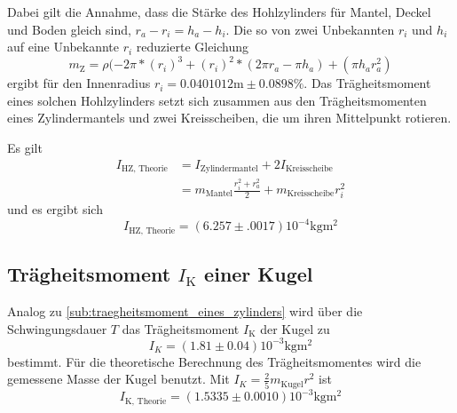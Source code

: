 Dabei gilt die Annahme, dass die Stärke des Hohlzylinders für Mantel, Deckel und Boden gleich sind, $r_a-r_i=h_a-h_i$. 
Die so von zwei Unbekannten $r_i$ und $h_i$ auf eine Unbekannte $r_i$ reduzierte Gleichung
\begin{equation}
	m_\text{Z}=\rho(-2\pi*(r_i)^3+(r_i)^2*(2\pi r_a-\pi h_a)+(\pi h_a r_a^2)
\end{equation}
ergibt für den Innenradius $r_i = 0.0401012\si{\meter}\pm0.0898\%$.
Das Trägheitsmoment eines solchen Hohlzylinders setzt sich zusammen aus den Trägheitsmomenten eines Zylindermantels und zwei Kreisscheiben, die um ihren Mittelpunkt rotieren\cite{kuchen}.

Es gilt
\begin{align*}
	I_{\text{HZ, Theorie}}&=I_{\text{Zylindermantel}}+2I_{\text{Kreisscheibe}}\\
	&=m_\text{Mantel} \frac{r_i^2+r_a^2}{2}+m_\text{Kreisscheibe} r_i^2
\end{align*}
und es ergibt sich
\begin{equation}
	I_{\text{HZ, Theorie}}= (6.257\pm.0017)10^{-4} \si{\kilo\gram\meter\squared}
\end{equation}
\subsection{Trägheitsmoment $I_\text{K}$ einer Kugel}

\noindent Analog zu \ref{sub:traegheitsmoment_eines_zylinders} wird über die Schwingungsdauer $T$ das Trägheitsmoment $I_\text{K}$ der Kugel zu
\begin{equation}
	\label{wert:Kugel}
	I_K=(1.81\pm0.04)10^{-3} \si{\kilo\gram\meter\squared}
\end{equation}
bestimmt.
Für die theoretische Berechnung des Trägheitsmomentes wird die gemessene Masse der Kugel benutzt.
Mit $I_K = \frac{2}{5} m_{\text{Kugel}} r^2$ \cite{kuchen} ist 
\begin{equation}
	\label{wert:Kugel}
	I_\text{K, Theorie}= (1.5335\pm0.0010)10^{-3} \si{\kilo\gram\meter\squared}
\end{equation}
